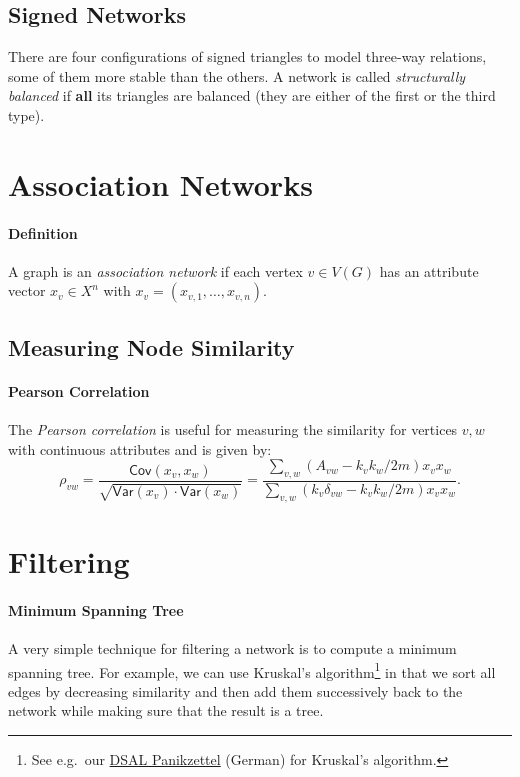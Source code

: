 \documentclass[english]{panikzettel}
\begin{document}


\subsection{Signed Networks}

There are four configurations of signed triangles to model three-way relations, some of them more stable than the others.
A network is called \textit{structurally balanced} if \textbf{all} its triangles are balanced (they are either of the first or the third type).



\section{Association Networks}

\paragraph{Definition}
A graph is an \textit{association network} if each vertex $v \in V(G)$ has an attribute vector $x_v \in X^n$ with $x_v = (x_{v,1},\dots,x_{v,n})$.

\subsection{Measuring Node Similarity}

\paragraph{Pearson Correlation}
The \textit{Pearson correlation} is useful for measuring the similarity for vertices $v,w$ with continuous attributes and is given by:
\[
    \rho_{vw} = \frac{\textsf{Cov}(x_v,x_w)}{\sqrt{\textsf{Var}(x_v)\cdot\textsf{Var}(x_w)}} = \frac{\sum_{v,w} (A_{vw} - k_v k_w/2m) x_v x_w}{\sum_{v,w} (k_v \delta_{vw} - k_v k_w/2m) x_v x_w}.
\]

\section{Filtering}

\paragraph{Minimum Spanning Tree}
A very simple technique for filtering a network is to compute a minimum spanning tree.
For example, we can use Kruskal's algorithm\footnote{See e.g.\ our \href{https://panikzettel.philworld.de/dsal.pdf}{DSAL Panikzettel} (German) for Kruskal's algorithm.} in that we sort all edges by decreasing similarity and then add them successively back to the network while making sure that the result is a tree.
\end{document}
